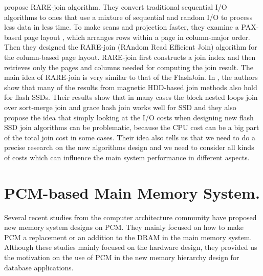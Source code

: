 \cite{shah2008fast} propose RARE-join algorithm. They convert traditional sequential I/O algorithms to ones that use a mixture of sequential and random I/O to process less data in less time. To make scans and projection faster, they examine a PAX-based page layout \cite{Ailamaki:2001:WRC:645927.672367}, which arranges rows within a page in column-major order. Then they designed the RARE-join (RAndom Read Efficient Join) algorithm for the column-based page layout. RARE-join first constructs a join index and then retrieves only the pages and columns needed for computing the join result. The main idea of RARE-join is very similar to that of the FlashJoin. In \cite{bausch2011performance}, the authors show that many of the results from magnetic HDD-based join methods also hold for flash SSDs. Their results show that in many cases the block nested loops join over sort-merge join and grace hash join works well for SSD and they also propose the idea that simply looking at the I/O costs when designing new flash SSD join algorithms can be problematic, because the CPU cost can be a big part of the total join cost in some cases. Their idea also tells us that we need to do a precise research on the new algorithms design and we need to consider all kinds of costs which can influence the main system performance in different aspects.



\section{PCM-based Main Memory System.}
Several recent studies
from the computer architecture community
have proposed new memory system designs on PCM.
They mainly focused on how to make PCM a
replacement or an addition to the DRAM in the main memory system.
Although these studies mainly
focused on the hardware design,
they provided us the motivation on the
use of PCM in the new memory hierarchy
design for database applications.


